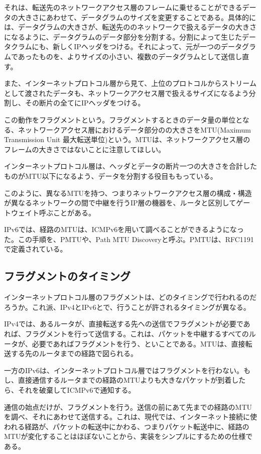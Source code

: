 それは、転送先のネットワークアクセス層のフレームに乗せることができるデータの大きさにあわせて、データグラムのサイズを変更することである。具体的には、データグラムの大きさが、転送先ののネットワークで扱えるデータの大きさになるように、データグラムのデータ部分を分割する。分割によって生じたデータクラムにも、新しくIPヘッダをつける。それによって、元が一つのデータグラムであったものを、よりサイズの小さい、複数のデータグラムとして送信し直す。

また、インターネットプロトコル層から見て、上位のプロトコルからストリームとして渡されたデータも、ネットワークアクセス層で扱えるサイズになるよう分割し、その断片の全てにIPヘッダをつける。

この動作をフラグメントという。フラグメントするときのデータ量の単位となる、ネットワークアクセス層におけるデータ部分のの大きさをMTU(Maximum Transmission Unit 最大転送単位)という。MTUは、ネットワークアクセス層のフレームの大きさではないことに注意してほしい。

インターネットプロトコル層は、ヘッダとデータの断片一つの大きさを合計したものがMTU以下になるよう、データを分割する役目ももっている。

このように、異なるMTUを持つ、つまりネットワークアクセス層の構成・構造が異なるネットワークの間で中継を行うIP層の機器を、ルータと区別してゲートウェイト呼ぶことがある。

IPv6では、経路のMTUは、ICMPv6を用いて調べることができるようになった。この手順を、PMTUや、Path MTU Discoveryと呼ぶ。PMTUは、RFC1191で定義されている。

\subsection{フラグメントのタイミング}
インターネットプロトコル層のフラグメントは、どのタイミングで行われるのだろうか。これ派、IPv4とIPv6とで、行うことが許されるタイミングが異なる。

IPv4では、あるルータが、直接転送する先への送信でフラグメントが必要であれば、フラグメントを行って送信する。これは、パケットを中継するすべてのルータが、必要であればフラグメントを行う、といことである。MTUは、直接転送する先のルータまでの経路で図られる。

一方のIPv6は、インターネットプロトコル層ではフラグメントを行わない。もし、直接通信するルータまでの経路のMTUよりも大きなパケットが到着したら、それを破棄してICMPv6で通知する。


通信の始点だけが、フラグメントを行う。送信の前にあて先までの経路のMTUを調べ、それにあわせて送信する。これは、現代では、インターネット接続に使われる経路が、パケットの転送中にかわる、つまりパケット転送中に、経路のMTUが変化することはほぼないことから、実装をシンプルにするための仕様である。


